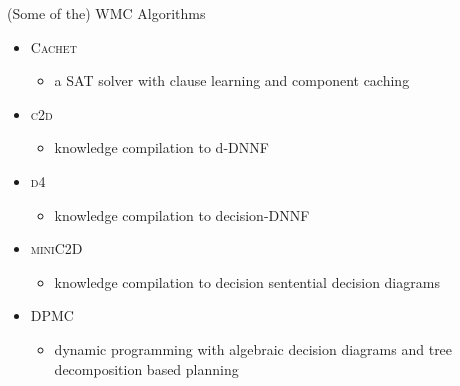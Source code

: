 \documentclass{beamer}
\begin{document}
\begin{frame}{(Some of the) WMC Algorithms}
  \begin{itemize}
    \item \textsc{Cachet} \textcolor{gray}{\parencite{DBLP:conf/sat/SangBBKP04}}
          \begin{itemize}
            \item a SAT solver with \alert{clause learning} and \alert{component
                  caching}
          \end{itemize}
    \item \textsc{c2d} \textcolor{gray}{\parencite{DBLP:conf/ecai/Darwiche04}}
          \begin{itemize}
            \item knowledge compilation to \alert{d-DNNF}
          \end{itemize}
    \item \textsc{d4} \textcolor{gray}{\parencite{DBLP:conf/ijcai/LagniezM17}}
          \begin{itemize}
            \item knowledge compilation to \alert{decision-DNNF}
          \end{itemize}
    \item \textsc{miniC2D} \textcolor{gray}{\parencite{DBLP:conf/ijcai/OztokD15}}
          \begin{itemize}
            \item knowledge compilation to \alert{decision sentential decision
                  diagrams}
          \end{itemize}
    \item \textsc{DPMC} \textcolor{gray}{\parencite{DBLP:conf/cp/DudekPV20}}
          \begin{itemize}
            \item dynamic programming with \alert{algebraic decision diagrams}
                  and \alert{tree decomposition} based planning
          \end{itemize}
  \end{itemize}
\end{frame}
\end{document}
